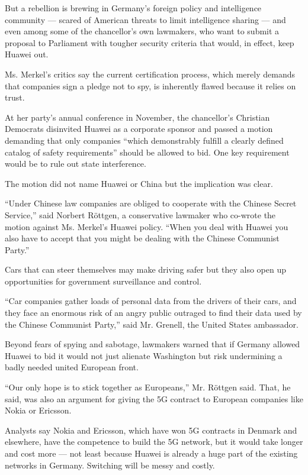 But a rebellion is brewing in Germany's foreign policy and intelligence
community --- scared of American threats to limit intelligence sharing
--- and even among some of the chancellor's own lawmakers, who want to
submit a proposal to Parliament with tougher security criteria that
would, in effect, keep Huawei out.

Ms. Merkel's critics say the current certification process, which merely
demands that companies sign a pledge not to spy, is inherently flawed
because it relies on trust.

At her party's annual conference in November, the chancellor's Christian
Democrats disinvited Huawei as a corporate sponsor and passed a motion
demanding that only companies ``which demonstrably fulfill a clearly
defined catalog of safety requirements'' should be allowed to bid. One
key requirement would be to rule out state interference.

The motion did not name Huawei or China but the implication was clear.

``Under Chinese law companies are obliged to cooperate with the Chinese
Secret Service,'' said Norbert Röttgen, a conservative lawmaker who
co-wrote the motion against Ms. Merkel's Huawei policy. ``When you deal
with Huawei you also have to accept that you might be dealing with the
Chinese Communist Party.''

Cars that can steer themselves may make driving safer but they also open
up opportunities for government surveillance and control.

``Car companies gather loads of personal data from the drivers of their
cars, and they face an enormous risk of an angry public outraged to find
their data used by the Chinese Communist Party,'' said Mr. Grenell, the
United States ambassador.

Beyond fears of spying and sabotage, lawmakers warned that if Germany
allowed Huawei to bid it would not just alienate Washington but risk
undermining a badly needed united European front.

``Our only hope is to stick together as Europeans,'' Mr. Röttgen said.
That, he said, was also an argument for giving the 5G contract to
European companies like Nokia or Ericsson.

Analysts say Nokia and Ericsson, which have won 5G contracts in Denmark
and elsewhere, have the competence to build the 5G network, but it would
take longer and cost more --- not least because Huawei is already a huge
part of the existing networks in Germany. Switching will be messy and
costly.

